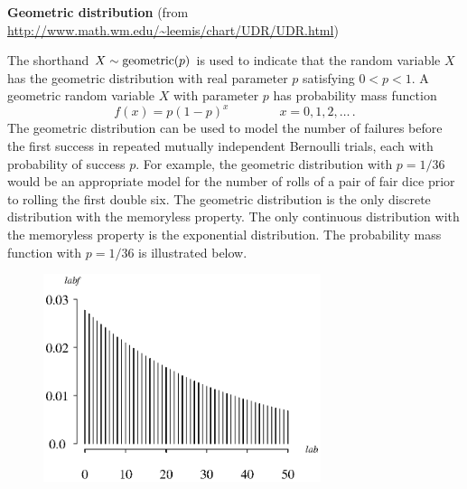 \documentclass[12pt,fullpage]{article}
\begin{document}
\noindent
{\bf Geometric distribution} (from \color{blue}\url{http://www.math.wm.edu/~leemis/chart/UDR/UDR.html}\color{black})

\noindent
The shorthand $X \sim {\rm geometric}(p)$ is used to indicate that the
random variable $X$ has the geometric distribution with real parameter $p$ satisfying $0 < p < 1$.
A geometric random variable $X$ with parameter $p$ has probability mass function 
$$
f(x) = p(1 - p) ^ {x} \qquad \qquad x=0,1,2,\ldots \, .
$$
The geometric distribution can be used to model the number of failures before the
first success in repeated mutually independent Bernoulli trials, each with probability 
of success $p$.
For example, the geometric distribution with $p = 1 / 36$ would be an appropriate
model for the number of rolls of a pair of fair dice prior to rolling the first
double six.
The geometric distribution is the only discrete distribution with the memoryless
property.
The only continuous distribution with the memoryless property is the exponential distribution.
The probability mass function with $p = 1/36$ is illustrated below.
{\begin{figure}[h!]
\begin{center}
\includegraphics[width=3.2in]{GeometricPlot.ps}
\end{center}
\end{figure}}
\end{document}
